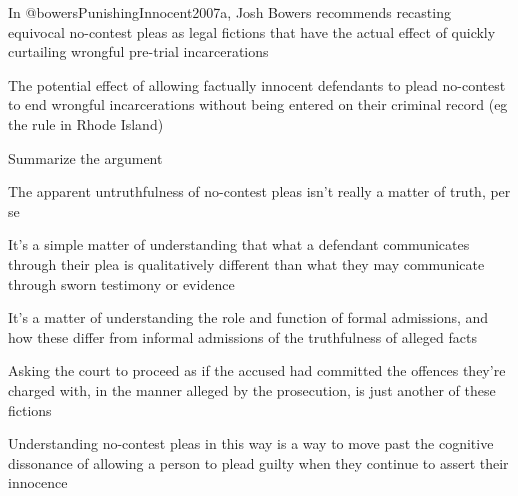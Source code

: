 In @bowersPunishingInnocent2007a, Josh Bowers recommends recasting equivocal no-contest pleas as legal fictions that have the actual effect of quickly curtailing wrongful pre-trial incarcerations

The potential effect of allowing factually innocent defendants to plead no-contest to end wrongful incarcerations without being entered on their criminal record (eg the rule in Rhode Island)

Summarize the argument

The apparent untruthfulness of no-contest pleas isn't really a matter of truth, per se

It's a simple matter of understanding that what a defendant communicates through their plea is qualitatively different than what they may communicate through sworn testimony or evidence

It's a matter of understanding the role and function of formal admissions, and how these differ from informal admissions of the truthfulness of alleged facts

Asking the court to proceed as if the accused had committed the offences they're charged with, in the manner alleged by the prosecution, is just another of these fictions

Understanding no-contest pleas in this way is a way to move past the cognitive dissonance of allowing a person to plead guilty when they continue to assert their innocence